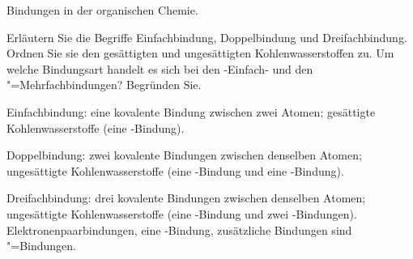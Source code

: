 \documentclass[DIV11]{scrartcl}
\begin{document}
\begin{question}[name=Bindungen III]
Bindungen in der organischen Chemie.
\begin{tasks}
  \task Erläutern Sie die Begriffe Einfachbindung, Doppelbindung und
    Dreifachbindung.  Ordnen Sie sie den gesättigten und ungesättigten
    Kohlenwasserstoffen zu.
  \task Um welche Bindungsart handelt es sich bei den -Einfach- und
    den "=Mehrfachbindungen?  Begründen Sie.
\end{tasks}
\end{question}
\begin{solution}[name=Bindungen III]
\begin{tasks}
  \task Einfachbindung: eine kovalente Bindung zwischen zwei Atomen;
    gesättigte Kohlenwasserstoffe (eine \Chemsigma-Bindung). \par
    Doppelbindung: zwei kovalente Bindungen zwischen denselben Atomen;
    ungesättigte Kohlenwasserstoffe (eine \Chemsigma-Bindung und eine
    \Chempi-Bindung). \par
    Dreifachbindung: drei kovalente Bindungen zwischen denselben Atomen;
    ungesättigte Kohlenwasserstoffe (eine \Chemsigma-Bindung und zwei
    \Chempi-Bindungen).
  \task Elektronenpaarbindungen, eine \Chemsigma-Bindung, zusätzliche
    Bindungen sind \Chempi"=Bindungen.
\end{tasks}
\end{solution}
\end{document}
